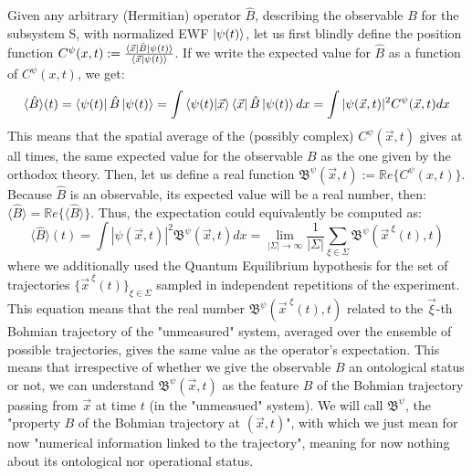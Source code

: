 \documentclass[11pt, a4paper]{article} %
\newcommand{\B}{\mathfrak{B}}
\begin{document}
Given any arbitrary (Hermitian) operator $\hat{B}$, describing the observable $B$ for the subsystem S, with normalized EWF $\ket{\psi(t)}$, let us first blindly define the position function $C^{\psi}(x,t):=\frac{\bra{\vec{x}}\hat{B}\ket{\psi(t)}}{\bra{\vec{x}}\ket{\psi(t)}}$. If we write the expected value for $\hat{B}$ as a function of $C^\psi(x,t)$, we get:
\begin{equation}
\langle \hat{B}\rangle(t)= \bra{\psi(t)}\hat{B}\ket{\psi(t)}=\int \bra{\psi(t)} \ket{\vec{x}}\bra{\vec{x}}\hat{B}\ket{\psi(t)}dx =  \int |\psi(\vec{x},t)|^2C^\psi(\vec{x},t)dx
\end{equation}
This means that the spatial average of the (possibly complex) $C^\psi(\vec{x},t)$ gives at all times, the same expected value for the observable $B$ as the one given by the orthodox theory. Then, let us define a real function $\B^\psi(\vec{x},t):=\mathbb{R}e\{C^{\psi}(x,t)\}$. Because $\hat{B}$ is an observable, its expected value will be a real number, then: $\langle \hat{B}\rangle=\mathbb{R}e\{\langle \hat{B}\rangle\}$. Thus, the expectation could equivalently be computed as:
\begin{equation}
\langle \hat{B}\rangle(t)=\int |\psi(\vec{x},t)|^2\B^\psi(\vec{x},t)dx= \lim_{|\Sigma|\rightarrow \infty}\frac{1}{|\Sigma|} \sum_{\xi\in\Sigma} \B^\psi(\vec{x}^{\:\xi}(t),t)
\end{equation}
where we additionally used the Quantum Equilibrium hypothesis \cite{Absolute} for the set of trajectories $\{\vec{x}^{\:\xi}(t)\}_{\xi\in\Sigma}$ sampled in independent repetitions of the experiment. This equation means that the real number $\B^\psi(\vec{x}^{\;\xi}(t),t)$ related to the $\vec{\xi}$-th Bohmian trajectory of the "unmeasured" system, averaged over the ensemble of possible trajectories, gives the same value as the operator's expectation. This means that  irrespective of whether we give the observable $B$ an ontological status or not, we can understand $\B^\psi(\vec{x},t)$ as the feature $B$ of the Bohmian trajectory passing from $\vec{x}$ at time $t$ (in the "unmeasued" system). We will call $\B^\psi$, the "property $B$ of the Bohmian trajectory at $(\vec{x},t)$", with which we just mean for now "numerical information linked to the trajectory", meaning for now nothing about its ontological nor operational status.
\end{document}
